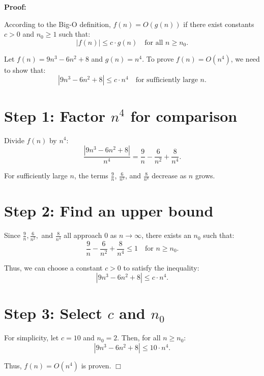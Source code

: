 \documentclass{article}
\begin{document}
\textbf{Proof:}

According to the Big-O definition, \( f(n) = O(g(n)) \) if there exist constants \( c > 0 \) and \( n_0 \geq 1 \) such that:
\[
|f(n)| \leq c \cdot g(n) \quad \text{for all } n \geq n_0.
\]

Let \( f(n) = 9n^3 - 6n^2 + 8 \) and \( g(n) = n^4 \). To prove \( f(n) = O(n^4) \), we need to show that:
\[
|9n^3 - 6n^2 + 8| \leq c \cdot n^4 \quad \text{for sufficiently large } n.
\]

\section*{Step 1: Factor \( n^4 \) for comparison}
Divide \( f(n) \) by \( n^4 \):
\[
\frac{|9n^3 - 6n^2 + 8|}{n^4} = \frac{9}{n} - \frac{6}{n^2} + \frac{8}{n^4}.
\]

For sufficiently large \( n \), the terms \( \frac{9}{n} \), \( \frac{6}{n^2} \), and \( \frac{8}{n^4} \) decrease as \( n \) grows.

\section*{Step 2: Find an upper bound}
Since \( \frac{9}{n}, \frac{6}{n^2}, \) and \( \frac{8}{n^4} \) all approach \( 0 \) as \( n \to \infty \), there exists an \( n_0 \) such that:
\[
\frac{9}{n} - \frac{6}{n^2} + \frac{8}{n^4} \leq 1 \quad \text{for } n \geq n_0.
\]

Thus, we can choose a constant \( c > 0 \) to satisfy the inequality:
\[
|9n^3 - 6n^2 + 8| \leq c \cdot n^4.
\]

\section*{Step 3: Select \( c \) and \( n_0 \)}
For simplicity, let \( c = 10 \) and \( n_0 = 2 \). Then, for all \( n \geq n_0 \):
\[
|9n^3 - 6n^2 + 8| \leq 10 \cdot n^4.
\]

Thus, \( f(n) = O(n^4) \) is proven. \(\Box\)
\end{document}
